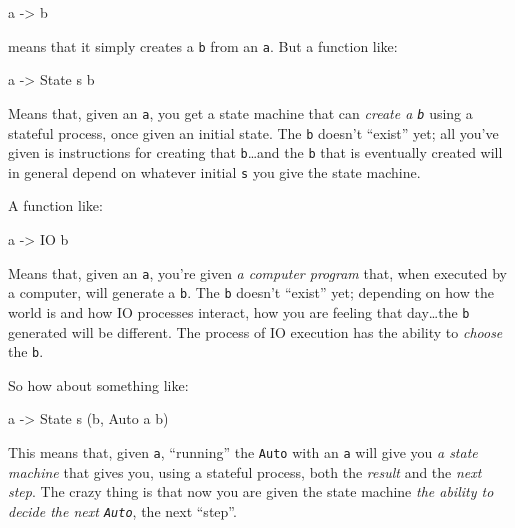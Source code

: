 \documentclass[]{article}
\newenvironment{Shaded}{}{}
\newcommand{\DataTypeTok}[1]{\textcolor[rgb]{0.56,0.13,0.00}{{#1}}}
\newcommand{\OtherTok}[1]{\textcolor[rgb]{0.00,0.44,0.13}{{#1}}}
\newcommand{\NormalTok}[1]{{#1}}
\begin{document}
\begin{Shaded}
\begin{Highlighting}[]
\NormalTok{a }\OtherTok{->} \NormalTok{b}
\end{Highlighting}
\end{Shaded}

means that it simply creates a \texttt{b} from an \texttt{a}. But a
function like:

\begin{Shaded}
\begin{Highlighting}[]
\NormalTok{a }\OtherTok{->} \DataTypeTok{State} \NormalTok{s b}
\end{Highlighting}
\end{Shaded}

Means that, given an \texttt{a}, you get a state machine that can
\emph{create a \texttt{b}} using a stateful process, once given an
initial state. The \texttt{b} doesn't ``exist'' yet; all you've given is
instructions for creating that \texttt{b}\ldots{}and the \texttt{b} that
is eventually created will in general depend on whatever initial
\texttt{s} you give the state machine.

A function like:

\begin{Shaded}
\begin{Highlighting}[]
\NormalTok{a }\OtherTok{->} \DataTypeTok{IO} \NormalTok{b}
\end{Highlighting}
\end{Shaded}

Means that, given an \texttt{a}, you're given \emph{a computer program}
that, when executed by a computer, will generate a \texttt{b}. The
\texttt{b} doesn't ``exist'' yet; depending on how the world is and how
IO processes interact, how you are feeling that day\ldots{}the
\texttt{b} generated will be different. The process of IO execution has
the ability to \emph{choose} the \texttt{b}.

So how about something like:

\begin{Shaded}
\begin{Highlighting}[]
\NormalTok{a }\OtherTok{->} \DataTypeTok{State} \NormalTok{s (b, }\DataTypeTok{Auto} \NormalTok{a b)}
\end{Highlighting}
\end{Shaded}

This means that, given \texttt{a}, ``running'' the \texttt{Auto} with an
\texttt{a} will give you \emph{a state machine} that gives you, using a
stateful process, both the \emph{result} and the \emph{next step}. The
crazy thing is that now you are given the state machine \emph{the
ability to decide the next \texttt{Auto}}, the next ``step''.
\end{document}
